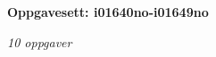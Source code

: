 \centerline{\bf Oppgavesett: i01640no-i01649no}
\vskip 10pt
\centerline{\it 10 oppgaver}\vskip 10pt
\vskip 10pt
